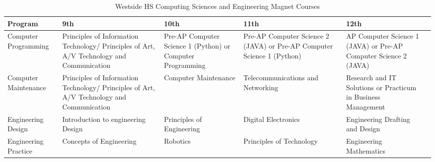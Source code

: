 \begin{table}[]
	\centering
	\footnotesize
	\caption{Westside HS Computing Sciences and Engineering Magnet Courses \cite{westside}}
	\label{westsidemag}
	\begin{tabular}{|p{2cm}|p{3.1cm}|p{3.1cm}|p{3.1cm}|p{3.1cm}|p{3.1cm}|}
		\hline
	\textbf{Program} & \textbf{9th}     & \textbf{10th}        & \textbf{11th}         & \textbf{12th}               \\ \hline
Computer Programming & Principles of Information Technology/ Principles of Art, A/V Technology and Communication & Pre-AP Computer Science 1 (Python) or Computer Programming & Pre-AP Computer Science 2 (JAVA) or Pre-AP Computer Science 1 (Python) & AP Computer Science 1 (JAVA) or Pre-AP Computer Science 2 (JAVA) \\ \hline
Computer Maintenance & Principles of Information Technology/ Principles of Art, A/V Technology and Communication & Computer Maintenance & Telecommunications and Networking & Research and IT Solutions or Practicum in Business Management    \\\hline
Engineering Design & Introduction to engineering Design & Principles of Engineering & Digital Electronics & Engineering Drafting and Design \\\hline
Engineering Practice & Concepts of Engineering & Robotics & Principles of Technology & Engineering Mathematics \\ \hline                                    \end{tabular}
\end{table}

